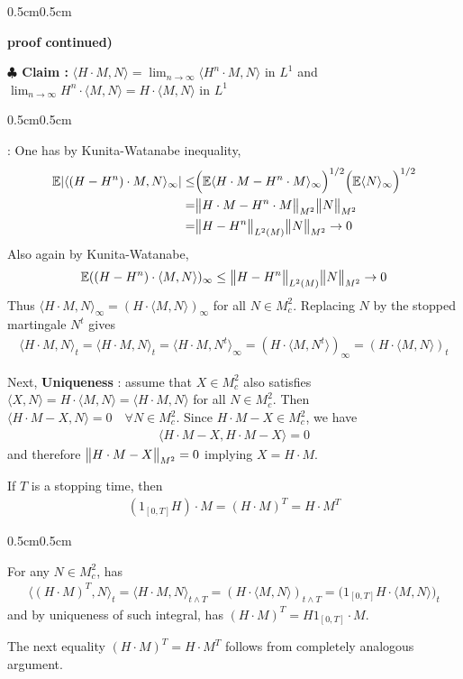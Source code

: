\documentclass[12pt,a4paper]{article}
\newenvironment{proof}
{\begin{changemargin}{0.5cm}{0.5cm} 
	}%
	{\end{changemargin}
}
\newenvironment{subproof}
{\begin{changemargin}{0.5cm}{0.5cm} 
	}%
	{\end{changemargin}
}
\newenvironment{p}
{\begin{proof} 
	}%
	{\end{proof}
}
\begin{document}
\begin{p}
\textbf{proof continued)}

\textbf{$\clubsuit$ Claim : } $\langle H \cdot M, N \rangle = \lim_{n\rightarrow \infty} \langle H^n \cdot M, N \rangle$ in $L^1$ and $\lim_{n\rightarrow \infty} H^n \cdot \langle M, N \rangle = H \cdot \langle M, N \rangle$ in $L^1$
\begin{subproof}
: One has by Kunita-Watanabe inequality,
\begin{align*}
\mathbb{E} |\langle (H - H^n) \cdot M, N \rangle_{\infty}| \leq & \Big( \mathbb{E} \langle H \cdot M - H^n \cdot M \rangle_{\infty} \Big)^{1/2} \Big( \mathbb{E} \langle N \rangle_{\infty}\Big)^{1/2}\\
= & \bigl\lVert H \cdot M - H^n \cdot M\bigr\rVert_{M^2} \bigl\lVert N\bigr\rVert_{M^2} \\
= & \bigl\lVert H - H^n\bigr\rVert_{L^2(M)}\bigl\lVert N\bigr\rVert_{M^2}  \rightarrow 0
\end{align*}
Also again by Kunita-Watanabe,
\begin{align*}\mathbb{E} ((H- H^n)\cdot \langle M, N \rangle)_{\infty} \leq \bigl\lVert H-H^n\bigr\rVert_{L^2(M)} \bigl\lVert N\bigr\rVert_{M^2} \rightarrow 0
\end{align*}
Thus $\langle H \cdot M, N \rangle_{\infty} = (H \cdot \langle M, N \rangle)_{\infty}$ for all $N \in M_c^2$. Replacing $N$ by the stopped martingale $N^t$ gives
\begin{align*}
\langle H\cdot M, N \rangle_t = \langle H \cdot M, N \rangle_t = \langle H \cdot M, N^t \rangle_{\infty} = (H \cdot \langle M, N^t \rangle)_{\infty} = (H\cdot \langle M, N \rangle)_t
\end{align*}
\end{subproof} 
Next, \textbf{Uniqueness} : assume that $X\in M^2_c$ also satisfies $\langle X, N \rangle = H \cdot \langle M, N \rangle = \langle H\cdot M, N \rangle$ for all $N \in M_c^2$. Then $\langle H \cdot M - X, N \rangle =0 \quad \forall N \in M^2_c$. Since $H \cdot M -X \in M_c^2$, we have
\begin{align*}
\langle H \cdot M -X, H \cdot M - X \rangle =0
\end{align*}
and therefore $\bigl\lVert H\cdot M - X\bigr\rVert_{M^2}=0$ implying $X = H\cdot M$.

\eop
\end{p}
\s

\corr If $T$ is a stopping time, then
\begin{align*}
(1_{[0, T]}H) \cdot M = (H \cdot M)^T = H\cdot M^T
\end{align*}
\begin{p}
\pf For any $N \in M_c^2$, has
\begin{align*}
\langle (H \cdot M)^T, N \rangle_t = \langle H \cdot M, N \rangle_{t\wedge T} = (H \cdot \langle M, N \rangle)_{t\wedge T} = \big( 1_{[0, T]} H \cdot \langle M, N \rangle \big)_t 
\end{align*}
and by uniqueness of such integral, has $(H \cdot M)^T = H 1_{[0, T]} \cdot M$.

\quad The next equality $(H \cdot M)^T = H \cdot M^T$ follows from completely analogous argument.

\eop
\end{p}
\s
\end{document}
